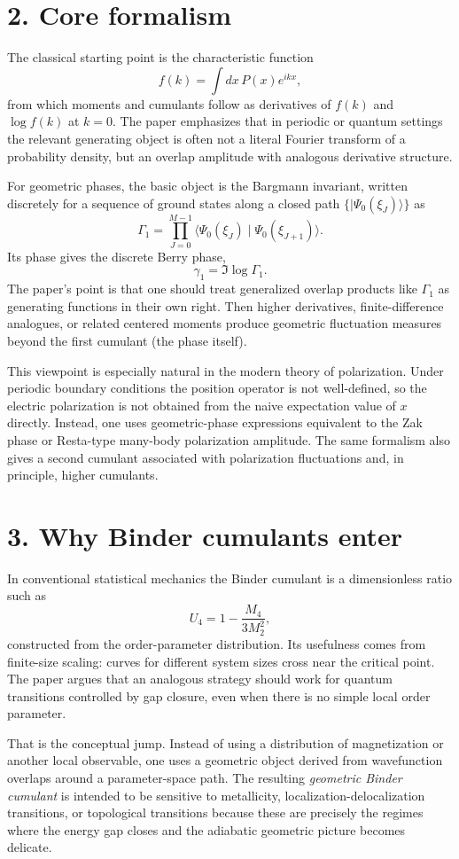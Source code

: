 \documentclass[11pt]{article}
\begin{document}
\section*{2. Core formalism}
The classical starting point is the characteristic function
\[
 f(k)=\int dx\,P(x)e^{ikx},
\]
from which moments and cumulants follow as derivatives of $f(k)$ and $\log f(k)$ at $k=0$. The paper emphasizes that in periodic or quantum settings the relevant generating object is often not a literal Fourier transform of a probability density, but an overlap amplitude with analogous derivative structure.

For geometric phases, the basic object is the Bargmann invariant, written discretely for a sequence of ground states along a closed path $\{\lvert \Psi_0(\xi_J) \rangle\}$ as
\[
\Gamma_1 = \prod_{J=0}^{M-1} \langle \Psi_0(\xi_J) \mid \Psi_0(\xi_{J+1}) \rangle.
\]
Its phase gives the discrete Berry phase,
\[
\gamma_1 = \Im \log \Gamma_1.
\]
The paper's point is that one should treat generalized overlap products like $\Gamma_1$ as generating functions in their own right. Then higher derivatives, finite-difference analogues, or related centered moments produce geometric fluctuation measures beyond the first cumulant (the phase itself).

This viewpoint is especially natural in the modern theory of polarization. Under periodic boundary conditions the position operator is not well-defined, so the electric polarization is not obtained from the naive expectation value of $x$ directly. Instead, one uses geometric-phase expressions equivalent to the Zak phase or Resta-type many-body polarization amplitude. The same formalism also gives a second cumulant associated with polarization fluctuations and, in principle, higher cumulants.

\section*{3. Why Binder cumulants enter}
In conventional statistical mechanics the Binder cumulant is a dimensionless ratio such as
\[
U_4 = 1 - \frac{M_4}{3M_2^2},
\]
constructed from the order-parameter distribution. Its usefulness comes from finite-size scaling: curves for different system sizes cross near the critical point. The paper argues that an analogous strategy should work for quantum transitions controlled by gap closure, even when there is no simple local order parameter.

That is the conceptual jump. Instead of using a distribution of magnetization or another local observable, one uses a geometric object derived from wavefunction overlaps around a parameter-space path. The resulting \emph{geometric Binder cumulant} is intended to be sensitive to metallicity, localization-delocalization transitions, or topological transitions because these are precisely the regimes where the energy gap closes and the adiabatic geometric picture becomes delicate.
\end{document}
